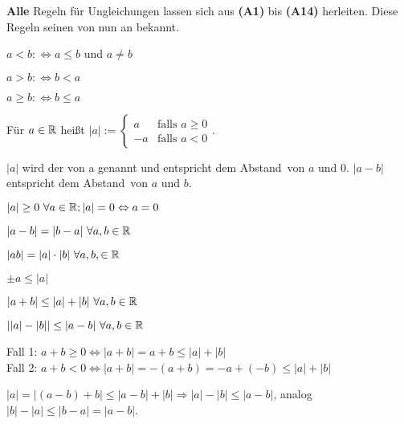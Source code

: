 \documentclass[a4paper,twoside,DIV15,BCOR12mm]{scrbook}
\begin{document}
\textbf{Alle} Regeln für Ungleichungen lassen sich aus \textbf{(A1)} bis \textbf{(A14)} herleiten. Diese Regeln seinen von nun an bekannt.

\begin{schreibweisen}
\begin{liste}
\item $a < b :\Leftrightarrow a \le b $ und $a \ne b$
\item $a > b :\Leftrightarrow b < a$
\item $a \ge b :\Leftrightarrow b \le a$
\end{liste}
\end{schreibweisen}

\begin{definition}[Betrag]
Für $a \in \mathbb{R}$ heißt $ |a| := 
\begin{cases}
 a & \mbox{falls } a \ge 0 \\
-a & \mbox{falls } a < 0
\end{cases} $. 

$|a|$ wird der  von a genannt und entspricht dem \glqq Abstand\grqq\ von $a$ und $0$. $|a-b|$ entspricht dem \glqq Abstand\grqq\ von $a$ und $b$.
\end{definition}

\begin{satz}[Betragssätze]
\begin{liste}
\item $|a| \ge 0 \ \forall a \in \mathbb{R}; |a|= 0 \Leftrightarrow a = 0$
\item $|a-b| = |b-a| \ \forall a,b \in \mathbb{R}$
\item $|ab|  = |a| \cdot |b| \ \forall a,b, \in \mathbb{R}$
\item $\pm a \le |a|$
\item $|a+b| \le |a|+|b| \ \forall a,b \in \mathbb{R}$
\item $||a| - |b|| \le |a - b| \ \forall a,b \in \mathbb{R}$
\end{liste}
\end{satz}

\begin{beweise}
\setcounter{enumi}{4}
\item Fall 1: $a+b \ge 0 \Leftrightarrow |a+b| = a+b \le |a| + |b|$ \\
Fall 2: $a+b  <  0 \Leftrightarrow |a+b| = -(a+b) = - a + (-b) \le |a| + |b|$ \\
\item $|a| = |(a-b) + b| \le |a-b| + |b| \Rightarrow |a| - |b| \le |a-b|$, analog $|b|-|a| \le |b-a| = |a-b|$.
\end{beweise}
\end{document}
